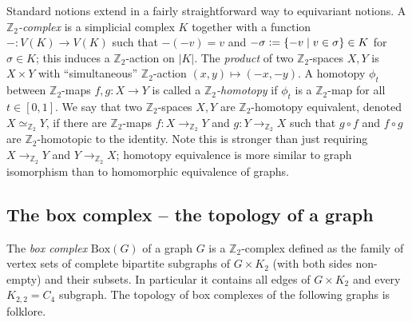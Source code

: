 \documentclass[11pt,a4paper]{scrartcl}
\numberwithin{theorem}{section}
\theoremstyle{definition}
\newcommand{\ZZ}{\mathbb{Z}}
\newcommand{\defeq}{\vcentcolon=}
\newcommand\Bx[1]{\mathrm{Box}(#1)}
\newcommand{\zeq}{\simeq_{\ZZ_2}}
\begin{document}
Standard notions extend in a fairly straightforward way to equivariant notions.
A \emph{$\ZZ_2$-complex} is a simplicial complex $K$ together with a function $- : V(K) \to V(K)$ such that $-(-v) = v$ and $-\sigma \defeq \{-v \mid v \in \sigma\}\in K$ for $\sigma \in K$; this induces a $\ZZ_2$-action on $|K|$.
The \emph{product} of two $\ZZ_2$-spaces $X,Y$ is $X \times Y$ with ``simultaneous'' $\ZZ_2$-action $(x,y)\mapsto (-x,-y)$.
A homotopy $\phi_t$ between $\ZZ_2$-maps $f,g:X \to Y$ is called a \emph{$\ZZ_2$-homotopy} if $\phi_t$ is a $\ZZ_2$-map for all $t\in[0,1]$.
We say that two $\ZZ_2$-spaces $X,Y$ are $\ZZ_2$-homotopy equivalent, denoted $X \zeq Y$, if there are $\ZZ_2$-maps $f: X \to_{\ZZ_2} Y$ and $g: Y \to_{\ZZ_2} X$ such that $g \circ f$ and $f \circ g$ are $\ZZ_2$-homotopic to the identity.
Note this is stronger than just requiring $X \to_{\ZZ_2} Y$ and $Y \to_{\ZZ_2} X$; homotopy equivalence is more similar to graph isomorphism than to homomorphic equivalence of graphs.

\subsection*{The box complex -- the topology of a graph}
The \emph{box complex} $\Bx{G}$ of a graph $G$ is a $\ZZ_2$-complex defined as the family of vertex sets of complete bipartite subgraphs of $G \times K_2$ (with both sides non-empty) and their subsets.
In particular it contains all edges of $G \times K_2$ and every $K_{2,2} = C_4$ subgraph.
The topology of box complexes of the following graphs is folklore.
\end{document}
